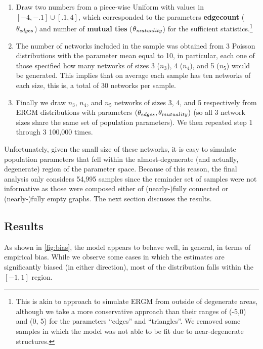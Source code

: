 \documentclass[12pt]{article}
\begin{document}
\begin{enumerate}

\item Draw two numbers from a piece-wise Uniform with values in $[-4, -.1]\cup[.1, 4]$, which corresponded to the parameters \textbf{edgecount} ($\theta_{edges}$) and number of \textbf{mutual ties} ($\theta_{mutuality}$) for the sufficient statistics.\footnote{This is akin to \cite{Schweinberger2015} approach to simulate ERGM from outside of degenerate areas, although we take a more conservative approach than their ranges of (-5,0) and (0, 5) for the parameters ``edges'' and ``triangles''. We removed some samples in which the model was not able to be fit due to near-degenerate structures.}

\item The number of networks included in the sample was obtained from 3 Poisson distributions with the parameter mean equal to 10, in particular, each one of those specified how many networks of sizes 3 ($n_3$), 4 ($n_4$), and 5 ($n_5$) would be generated. This implies that on average each sample has ten networks of each size, this is, a total of 30 networks per sample.

\item Finally we draw $n_3$, $n_4$, and $n_5$ networks of sizes 3, 4, and 5 respectively from ERGM distributions with parameters $(\theta_{edges}, \theta_{mutuality})$ (so all 3 network sizes share the same set of population parameters). We then repeated step 1 through 3 100,000 times.
\end{enumerate}

Unfortunately, given the small size of these networks, it is easy to simulate population parameters that fell within the almost-degenerate (and actually, degenerate) region of the parameter space. Because of this reason, the final analysis only considers 54,995 samples since the reminder set of samples were not informative as those were composed either of (nearly-)fully connected or (nearly-)fully empty graphs. The next section discusses the results.

\subsection{Results}

As shown in \autoref{fig:bias}, the model appears to behave well, in general, in terms of empirical bias. While we observe some cases in which the estimates are significantly biased (in either direction), most of the distribution falls within the $[-1,1]$ region.
\end{document}
